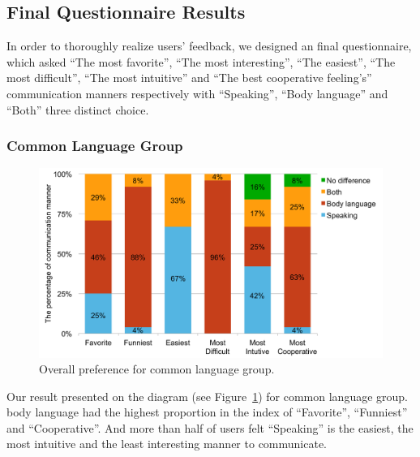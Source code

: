 \subsection{Final Questionnaire Results}
In order to thoroughly realize users' feedback, we designed an final questionnaire, which asked ``The most favorite'', ``The most interesting'', ``The easiest'', ``The most difficult'', ``The most intuitive'' and ``The best cooperative feeling's'' communication manners respectively with ``Speaking'', ``Body language'' and ``Both'' three distinct choice.

\subsubsection{Common Language Group}

\begin{figure}[!h]
\centering
\includegraphics[width=0.9\columnwidth]{Figures/US_FQ_Com.pdf}
\caption{Overall preference for common language group.}
\label{fig:US_FQ_Com}
\end{figure}

Our result presented on the diagram (see Figure~\ref{fig:US_FQ_Com}) for common language group. 
body language had the highest proportion in the index of ``Favorite'', ``Funniest'' and ``Cooperative''.
And more than half of users felt ``Speaking'' is the easiest, the most intuitive and the least interesting manner to communicate.

